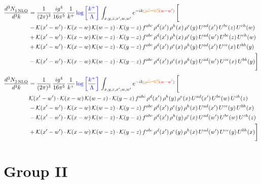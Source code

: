 \documentclass[9pt]{article}
\numberwithin{equation}{section}
\begin{document}
\begin{align}
    \frac{d^{3}N_{1\,\rm NLO}^{\rm}}{d^{3}k}  & = \frac{1}{(2\pi)^{3}}\, \frac{ig^{4}}{16\pi^{5}}\, \frac{1}{k^{+}}\, {\color{blue}\log{\left[\frac{k^{+}}{\Lambda}\right]}}\,\int_{x,y,z,x^{\prime},w,w^{\prime}}e^{-ik{\color{orange}\cancel{(w^{\prime}-w)}}{\color{red}(w-w^{\prime})}}\, \Bigg[\notag \\ & -\mathcal{K}(x'-w')\cdot \mathcal{K}(x-w)\, \mathcal{K}(w-z)\cdot \mathcal{K}(y-z)\,f^{abc}\,\rho^{d}(x')\,\rho^{h}(x)\,\rho^{e}(y)\,U^{ad}(x')\,U^{be}(z)\,U^{ch}(w)\notag \\ & + \mathcal{K}(x'-w')\cdot \mathcal{K}(x-w)\, \mathcal{K}(w-z)\cdot \mathcal{K}(y-z)\,f^{abc}\,\rho^{d}(x')\,\rho^{h}(x)\,\rho^{e}(y)\,U^{ad}(w')\,U^{be}(z)\,U^{ch}(w)\notag \\ & +\mathcal{K}(x'-w')\cdot \mathcal{K}(x-w)\, \mathcal{K}(w-z)\cdot \mathcal{K}(y-z)\,f^{abc}\,\rho^{d}(x')\,\rho^{e}(x)\,\rho^{h}(y)\,U^{ad}(x')\,U^{ce}(x)\,U^{bh}(y)\notag \\ & -\mathcal{K}(x'-w')\cdot \mathcal{K}(x-w)\, \mathcal{K}(w-z)\cdot \mathcal{K}(y-z)\,f^{abc}\,\rho^{d}(x')\,\rho^{e}(x)\,\rho^{h}(y)\,U^{ad}(w')\,U^{ce}(x)\,U^{bh}(y) \Bigg]
\end{align}
\begin{align}
    \frac{d^{3}N_{2\,\rm NLO}^{\rm}}{d^{3}k}  & = \frac{1}{(2\pi)^{3}}\, \frac{ig^{4}}{16\pi^{5}}\, \frac{1}{k^{+}}\, {\color{blue}\log{\left[\frac{k^{+}}{\Lambda}\right]}}\,\int_{x,y,z,x^{\prime},w,w^{\prime}}e^{-ik{\color{orange}\cancel{(w^{\prime}-w)}}{\color{red}(w-w^{\prime})}}\, \Bigg[\notag \\ & \mathcal{K}(x'-w')\cdot \mathcal{K}(x-w)\, \mathcal{K}(w-z)\cdot \mathcal{K}(y-z)\,f^{abc}\,\rho^{d}(x')\,\rho^{h}(y)\,\rho^{e}(x)\,U^{ad}(x')\,U^{be}(w)\,U^{ch}(z)\notag \\ & - \mathcal{K}(x'-w')\cdot \mathcal{K}(x-w)\, \mathcal{K}(w-z)\cdot \mathcal{K}(y-z)\,f^{abc}\,\rho^{d}(x')\,\rho^{e}(y)\,\rho^{h}(x)\,U^{ad}(x')\,U^{ce}(y)\,U^{bh}(x)\notag \\ & -\mathcal{K}(x'-w')\cdot \mathcal{K}(x-w)\, \mathcal{K}(w-z)\cdot \mathcal{K}(y-z)\,f^{abc}\,\rho^{d}(x')\,\rho^{h}(y)\,\rho^{e}(x)\,U^{ad}(w')\,U^{be}(w)\,U^{ch}(z)\,\notag \\ & + \mathcal{K}(x'-w')\cdot \mathcal{K}(x-w)\, \mathcal{K}(w-z)\cdot \mathcal{K}(y-z)\,f^{abc}\,\rho^{d}(x')\,\rho^{e}(y)\,\rho^{h}(x)\,U^{ad}(w')\,U^{ce}(y)\,U^{bh}(x) \Bigg]
\end{align}
\section{Group II}
\end{document}
